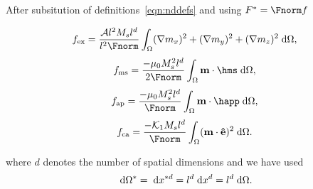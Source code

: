 After subsitution of definitions~\eqref{eqn:nddefs} and using $F^* = \Fnorm f$


\begin{equation}
  f_\text{ex} =  \frac{\exchc l^2 M_s l^d}{l^2\Fnorm} \int_{\magd} (\nabla m_x)^2  + (\nabla m_y)^2  + (\nabla m_z)^2 \d \magd,
\end{equation}
\begin{equation}
  f_\text{ms} = \frac{-\mu_0 M_s^2 l^d}{2\Fnorm} \int_{\magd} \mv \cdot \hms \d \magd,
\end{equation}
\begin{equation}
  f_\text{ap} = \frac{- \mu_0 M_s^2 l^d}{\Fnorm} \int_{\magd} \mv \cdot \happ \d \magd,
\end{equation}
\begin{equation}
  f_\text{ca} = \frac{ - \kone M_s l^d}{\Fnorm} \int_\magd (\mv \cdot \ev)^2 \d \magd.
\end{equation}

where $d$ denotes the number of spatial dimensions and we have used 
\begin{equation} 
  {\; \text{d}} \Omega^* = {\; \text{d}} x^{*d} = l^d {\; \text{d}} x^d = l^d {\; \text{d}} \Omega.
\end{equation}


